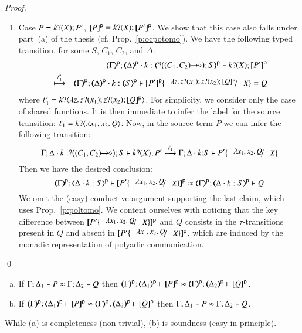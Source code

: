\begin{proof}
\begin{enumerate}[1.]
\item Case $P =  k ? (X) ; P' $, 
$\map{P}^{\mathsf{p}} = 
		\binp{k}{X} \map{P'}^{\mathsf{p}}$.
		We show that this case also falls under part~(a) of the thesis (cf. Prop.~\ref{p:ocpotomo}). 
We have  the following typed transition, for some $S$, $C_1$, $C_2$, and $\Delta$:
\begin{eqnarray*}
& & \mapt{\Gamma}^{\mathsf{p}}; 
\mapt{\Delta}^{\mathsf{p}}\cat k:\tmap{\bbtinp{\shot{(C_1,  C_2)}} S}{\mathsf{p}}
\proves 
\binp{k}{X} \map{P'}^{\mathsf{p}} \\
& \hby{\ell'_1} & 
\mapt{\Gamma}^{\mathsf{p}}; 
\mapt{\Delta}^{\mathsf{p}}\cat k:\tmap{ S}{\mathsf{p}} 
\proves 
\map{P'}^{\mathsf{p}}\subst{\abs{z}\binp{z}{x_1} \binp{z}{x_2} \map{Q}^{\mathsf{p}}}{X} = Q
\end{eqnarray*}
where 
 $\ell'_1 = k ? \langle \lambda z.\,z ? (x_1) ; z ? (x_2) ; [\!\![Q]\!\!]^{\mathsf{p}} \rangle $. 
For simplicity, we consider only the case of shared functions.
It is then immediate to infer the label for the source transition:
$\ell_1 = k ? \langle \lambda x_1,  x_2.\,Q \rangle $. 
Now, in the source term $P$ we can infer the following transition:
$$
\stytra{\Gamma}{\ell_1}{\Delta\cat k:\bbtinp{\shot{(C_1, C_2)}} S}{ \binp{k}{X} P'}{\Delta\cat k{:}S}{P'\subst{\abs{x_1,  x_2}{Q}}{X}}
$$
Then we have the desired conclusion:
$$\wbb{\mapt{\Gamma}^{\mathsf{p}}}{\ell}{\mapt{\Delta\cat k:S}^{\mathsf{p}}}{\map{P'\subst{\abs{x_1,  x_2}{Q}}{X}}^{\mathsf{p}}}{\mapt{\Delta\cat k:S}^{\mathsf{p}}}{Q}$$
We omit the (easy) conductive argument supporting the last claim,
which uses Prop.~\ref{p:poltomo}.
We content ourselves with noticing that the key difference between 
${\map{P'\subst{\abs{x_1,  x_2}{Q}}{X}}^{\mathsf{p}}}$
and $Q$ consists in the $\tau$-transitions present in $Q$  and absent in ${\map{P'\subst{\abs{x_1,  x_2}{Q}}{X}}^{\mathsf{p}}}$, which are induced   by the monadic representation of polyadic communication.
\end{enumerate}
\qed
\end{proof}

\begin{conjecture}
\begin{enumerate}[a)]
\item
If
$ \Gamma; \Delta_1 \vdash  P  \approx  \Gamma;  \Delta_2 \vdash Q $
then
$\wbb{\mapt{\Gamma}^{\mathsf{p}}}{\ell}{\mapt{\Delta_1}^{\mathsf{p}}}{\map{P}^{\mathsf{p}}}{\mapt{\Delta_2}^{\mathsf{p}}}
{\map{Q}^{\mathsf{p}}}$.
\item  
If 
$\wbb{\mapt{\Gamma}^{\mathsf{p}}}{\ell}{\mapt{\Delta_1}^{\mathsf{p}}}{\map{P}^{\mathsf{p}}}{\mapt{\Delta_2}^{\mathsf{p}}}
{\map{Q}^{\mathsf{p}}}$
then 
$ \Gamma; \Delta_1 \vdash  P  \approx  \Gamma;  \Delta_2 \vdash Q $.
\end{enumerate}
While (a) is  completeness (non trivial), (b) is soundness  (easy in principle).
\end{conjecture}

